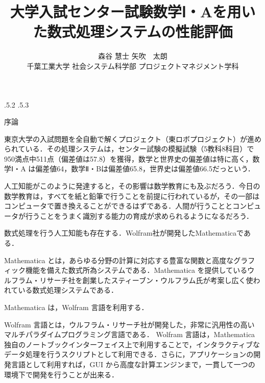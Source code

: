 \documentclass[uplatex,twocolumn]{jsarticle}
\title{\vspace{-10mm}大学入試センター試験数学Ⅰ・Aを用いた数式処理システムの性能評価 \footnotemark[0]}
\author{森谷 慧士 \footnotemark[2]\qquad 矢吹　太朗  \\ 千葉工業大学 社会システム科学部 プロジェクトマネジメント学科\footnotemark[2]}
\date{}%
\makeatletter
\renewcommand{\section}{%
    \if@slide\clearpage\fi
    \@startsection{section}{1}{\z@}%
    {\Cvs \@plus.5\Cdp \@minus.2\Cdp}%
    {.5\Cvs \@plus.3\Cdp}%
    {\normalfont\raggedright}}
\makeatother
\begin{document}
\twocolumn[\maketitle]

\begingroup
\def\thefootnote{\fnsymbol{footnote}}
\endgroup




\section{序論}


 
東京大学の入試問題を全自動で解くプロジェクト（東ロボプロジェクト）が進められている\cite{arai2014}．その処理システムは，センター試験の模擬試験（5教科8科目）で950満点中511点（偏差値は57.8）を獲得，数学と世界史の偏差値は特に高く，数学Ⅰ・A は偏差値64，数学Ⅱ・Bは偏差値65.8，世界史は偏差値66.5だっという\cite{tourobo}．

人工知能がこのように発達すると，その影響は数学教育にも及ぶだろう．今日の数学教育は，すべてを紙と鉛筆で行うことを前提に行われているが，その一部は コンピュータで置き換えることができるはずである．人間が行うこととコンピュータが行うことをうまく識別する能力の育成が求められるようになるだろう．

数式処理を行う人工知能も存在する．Wolfram社が開発したMathematicaである．

Mathematica とは，あらゆる分野の計算に対応する豊富な関数と高度なグラフィック機能を備えた数式所為システムである．Mathematica を提供しているウルフラム・リサーチ社を創業したスティーブン・ウルフラム氏が考案し広く使われている数式処理システムである\cite{wolfram2014}．

Mathematica は，Wolfram 言語を利用する．

Wolfram 言語とは，ウルフラム・リサーチ社が開発した，非常に汎用性の高いマルチパラダイムプログラミング言語である．
Wolfram 言語は，Mathematica 独自のノートブックインターフェイス上で利用することで，インタラクティブなデータ処理を行うスクリプトとして利用できる．さらに，アプリケーションの開発言語として利用すれば，GUI から高度な計算エンジンまで，一貫して一つの環境下で開発を行うことが出来る．
\end{document}
